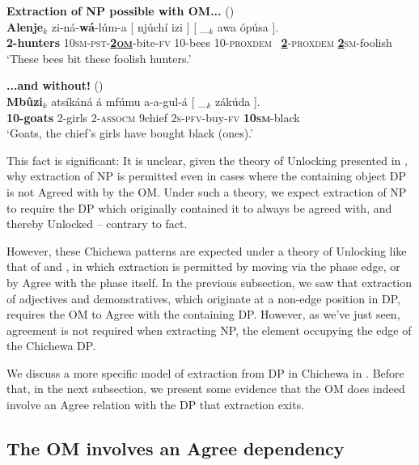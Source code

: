 \documentclass[output=paper,colorlinks,citecolor=brown]{langscibook}
\begin{document}
\ea%
    \label{ex:branan:9}
    \textbf{Extraction of NP possible with OM...} \hfill{(\citealt[50, ex. 16c]{Mchombo2004})}\\
    \gll    \textbf{Alenje}$_{k}$  zi-n\'{a}-\textbf{w\'{a}}-l\'{u}m-a [ nj\'{u}ch\'{i} izi ] [ \_$_{k}$  awa \'{o}p\'{u}sa ]. \\
            \textbf{2-hunters} 10\textsc{sm-pst}-\textbf{\underline{2\textsc{om}}}-bite-\textsc{fv} {} 10-bees 10-\textsc{proxdem} {} {} \, \underline{\textbf{2}}-\textsc{proxdem} \underline{\textbf{2}}\textsc{sm}-foolish \\
    \glt    `These bees bit these foolish hunters.'
\z

\ea%
    \label{ex:branan:10}
    \textbf{...and without!} \hfill{(\citealt[ex. 4]{Mchombo2006})}\\
    \gll    \textbf{Mb\^{u}zi}$_{k}$ ats\'{i}k\'{a}n\'{a} \'{a} mf\'{u}mu a-a-gul-\'{a} [ \_$_{k}$ z\'{a}k\'{u}da ]. \\
            \textbf{10-goats} 2-girls 2-\textsc{assocm} 9chief 2\textsc{s-pfv}-buy-\textsc{fv} {} {} \textbf{10\textsc{sm}}-black   \\
    \glt    `Goats, the chief's girls have bought black (ones).'
\z

This fact is significant: It is unclear, given the theory of Unlocking presented in \citet{VanUrkRichards2015}, why extraction of NP is permitted even in cases where the containing object DP is not Agreed with by the OM. Under such a theory, we expect extraction of NP to require the DP which originally contained it to always be agreed with, and thereby Unlocked -- contrary to fact.

However, these Chichewa patterns are expected under a theory of Unlocking like that of \citet{RackowskiRichards2005} and \citet{Branan2018}, in which extraction is permitted by moving via the phase edge, or by Agree with the phase itself. In the previous subsection, we saw that extraction of adjectives and demonstratives, which originate at a non-edge position in DP, requires the OM to Agree with the containing DP. However, as we've just seen, agreement is not required when extracting NP, the element occupying the edge of the Chichewa DP.

We discuss a more specific model of extraction from DP in Chichewa in . Before that, in the next subsection, we present some evidence that the OM does indeed involve an Agree relation with the DP that extraction exits.

\subsection{The OM involves an Agree dependency}\label{sec:branan:3.3}
\end{document}
